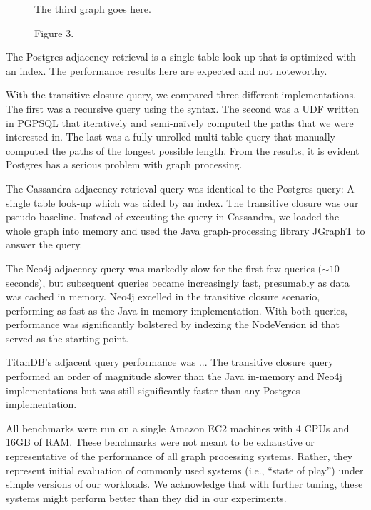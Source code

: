 \documentclass{sig-alternate}
\begin{document}
\begin{figure}
\vspace{0.75in}
The third graph goes here.
\vspace{0.75in}
\caption{Figure 3.}
\label{fig:fig3}
\end{figure}

 The Postgres adjacency retrieval is a single-table look-up that is optimized with an index. 
The performance results here are expected and not noteworthy.

With the transitive closure query, we compared three different implementations. The first was a recursive query using the  syntax. 
The second was a UDF written in PGPSQL that iteratively and semi-naïvely computed the paths that we were interested in. 
The last was a fully unrolled multi-table query that manually computed the paths of the longest possible length. From  the results, it is evident Postgres has a serious problem with graph processing.

 The Cassandra adjacency retrieval query was identical to the Postgres query: A single table look-up which was aided by an index.
The transitive closure was our pseudo-baseline. Instead of executing the query in Cassandra, we loaded the whole graph into memory and used the Java graph-processing library JGraphT to answer the query.

 The Neo4j adjacency query was markedly slow for the first few queries 
($\sim 10$ seconds), 
but subsequent queries became increasingly fast, presumably as data was cached in memory. 
Neo4j excelled in the transitive closure scenario, performing as fast as the Java in-memory implementation. 
With both queries, performance was significantly bolstered by indexing the NodeVersion id that served as the starting point.

 TitanDB's adjacent query performance was ... 
The transitive closure query performed an order of magnitude slower than the Java in-memory and Neo4j implementations but was still significantly faster than any Postgres implementation.

\smallitembot

All benchmarks were run on a single Amazon EC2  machines with 4 CPUs and 16GB of RAM. 
These benchmarks were not meant to be exhaustive or representative of the performance of all graph processing systems. 
Rather, they represent initial evaluation of commonly used systems (i.e., ``state of play'') under simple versions of our workloads.
We acknowledge that with further tuning, these systems might perform better than they did in our experiments.
\end{document}
